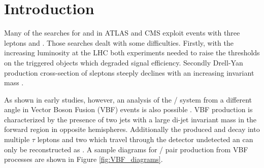 \section {Introduction}

Many of the searches for \charginopm and \neutralinotwo in ATLAS \cite{Aad:2012hba, ATLAS:2012ab} and CMS \cite{Chatrchyan:2012mea} exploit events with three leptons and \met. Those searches dealt with some difficulties. Firstly, with the increasing luminosity at the LHC both experiments needed to raise the \pt thresholds on the triggered objects which degraded signal efficiency. Secondly Drell-Yan production cross-section of sleptons steeply declines with an increasing invariant mass \cite{Baer:1997nh}.

As shown in early studies, however, an analysis of the \charginopm / \neutralinotwo system from a different angle  in Vector Boson Fusion (VBF) events is also possible \cite{Bjorken:1992er}. VBF production is characterized by the presence of two jets with a large di-jet invariant mass in the forward region in opposite hemispheres. Additionally the produced \charginopm and \neutralinotwo decay into multiple $\tau$ leptons and two \neutralinoone which travel through the detector undetected an can only be reconstructed as \met. A sample diagrams for \charginopm / \neutralinotwo pair production from VBF processes are shown in Figure \ref{fig:VBF_diagrams}. 

